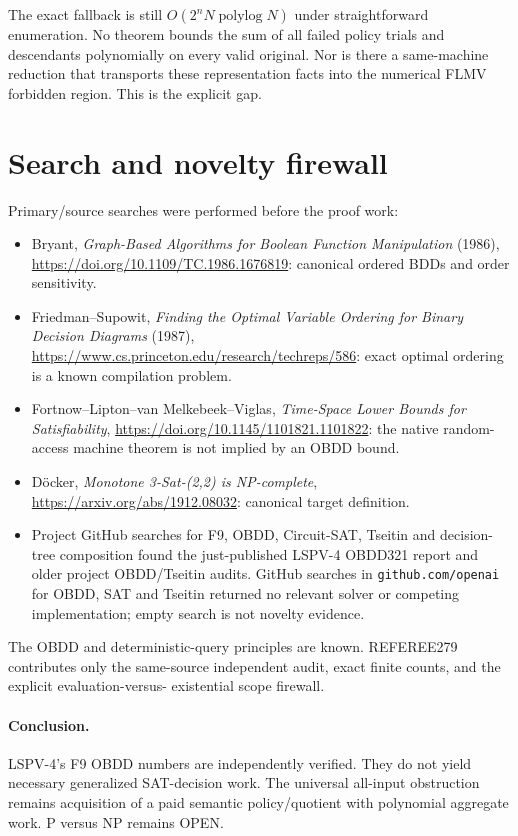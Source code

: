 \documentclass[11pt]{article}
\begin{document}
The exact fallback is still
$O(2^nN\operatorname{polylog}N)$ under straightforward enumeration.  No theorem bounds the
sum of all failed policy trials and descendants polynomially on every valid original.  Nor
is there a same-machine reduction that transports these representation facts into the
numerical FLMV forbidden region.  This is the explicit gap.

\section{Search and novelty firewall}

Primary/source searches were performed before the proof work:
\begin{itemize}
\item Bryant, \emph{Graph-Based Algorithms for Boolean Function Manipulation} (1986),
\url{https://doi.org/10.1109/TC.1986.1676819}: canonical ordered BDDs and order sensitivity.
\item Friedman--Supowit, \emph{Finding the Optimal Variable Ordering for Binary Decision
Diagrams} (1987), \url{https://www.cs.princeton.edu/research/techreps/586}: exact optimal
ordering is a known compilation problem.
\item Fortnow--Lipton--van Melkebeek--Viglas, \emph{Time-Space Lower Bounds for
Satisfiability}, \url{https://doi.org/10.1145/1101821.1101822}: the native random-access
machine theorem is not implied by an OBDD bound.
\item D\"ocker, \emph{Monotone 3-Sat-(2,2) is NP-complete},
\url{https://arxiv.org/abs/1912.08032}: canonical target definition.
\item Project GitHub searches for F9, OBDD, Circuit-SAT, Tseitin and decision-tree
composition found the just-published LSPV-4 OBDD321 report and older project OBDD/Tseitin
audits.  GitHub searches in \texttt{github.com/openai} for OBDD, SAT and Tseitin returned no
relevant solver or competing implementation; empty search is not novelty evidence.
\end{itemize}
The OBDD and deterministic-query principles are known.  REFEREE279 contributes only the
same-source independent audit, exact finite counts, and the explicit evaluation-versus-
existential scope firewall.

\paragraph{Conclusion.}
LSPV-4's F9 OBDD numbers are independently verified.  They do not yield necessary
generalized SAT-decision work.  The universal all-input obstruction remains acquisition of a
paid semantic policy/quotient with polynomial aggregate work.  P versus NP remains OPEN.
\end{document}
